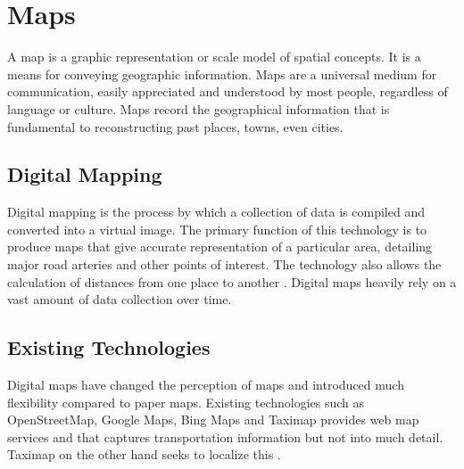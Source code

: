 \section{Maps}
A map is a graphic representation or scale model of spatial concepts. It is a means for conveying geographic information. Maps are a universal medium for communication, easily appreciated and understood by most people, regardless of language or culture. Maps record the geographical information that is fundamental to reconstructing past places, towns, even cities.

\subsection{Digital Mapping}
Digital mapping is the process by which a collection of data is compiled and converted into a virtual image. The primary function of this technology is to produce maps that give accurate representation of a particular area, detailing major road arteries and other points of interest. The technology also allows the calculation of distances from one place to another \cite{husbyjonathon2008}. Digital maps heavily rely on a vast amount of data collection over time.

\subsection{Existing Technologies}
Digital maps have changed the perception of maps and introduced much flexibility compared to paper maps. Existing technologies such as OpenStreetMap, Google Maps, Bing Maps and Taximap provides web map services and that captures transportation information but not into much detail. Taximap on the other hand seeks to localize this \citep{vinet2014arch}.

